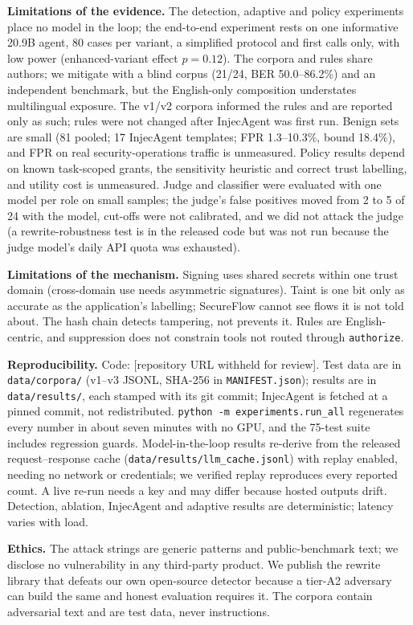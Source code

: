 \documentclass[conference]{IEEEtran}
\newcommand{\repourl}{[repository URL withheld for review]}
\newcommand{\repourl}{\url{https://github.com/piyushrajyadav/Secure-Flow}}
\begin{document}
\textbf{Limitations of the evidence.} The detection, adaptive and policy experiments place
no model in the loop; the end-to-end experiment rests on one informative 20.9B agent,
80 cases per variant, a simplified protocol and first calls only, with low power
(enhanced-variant effect $p=0.12$). The corpora and rules share authors; we mitigate with
a blind corpus (21/24, BER 50.0--86.2\%) and an independent benchmark, but the
English-only composition understates multilingual exposure. The v1/v2 corpora informed
the rules and are reported only as such; rules were not changed after InjecAgent was
first run. Benign sets are small (81 pooled; 17 InjecAgent templates; FPR 1.3--10.3\%,
bound 18.4\%), and FPR on real security-operations traffic is unmeasured. Policy results
depend on known task-scoped grants, the sensitivity heuristic and correct trust
labelling, and utility cost is unmeasured. Judge and classifier were evaluated with one
model per role on small samples; the judge's false positives moved from 2 to 5 of 24 with
the model, cut-offs were not calibrated, and we did not attack the judge (a
rewrite-robustness test is in the released code but was not run because the judge
model's daily API quota was exhausted).

\textbf{Limitations of the mechanism.} Signing uses shared secrets within one trust
domain (cross-domain use needs asymmetric signatures). Taint is one bit only as accurate
as the application's labelling; SecureFlow cannot see flows it is not told about. The
hash chain detects tampering, not prevents it. Rules are English-centric, and
suppression does not constrain tools not routed through \texttt{authorize}.

\textbf{Reproducibility.} Code: \repourl{}. Test data are in
\texttt{data/corpora/} (v1--v3 JSONL, SHA-256 in \texttt{MANIFEST.json}); results are in
\texttt{data/results/}, each stamped with its git commit; InjecAgent is fetched at a
pinned commit, not redistributed. \texttt{python -m experiments.run\_all} regenerates
every number in about seven minutes with no GPU, and the 75-test suite includes
regression guards. Model-in-the-loop results re-derive from the released
request--response cache (\texttt{data/results/llm\_cache.jsonl}) with replay enabled,
needing no network or credentials; we verified replay reproduces every reported count.
A live re-run needs a key and may differ because hosted outputs drift. Detection,
ablation, InjecAgent and adaptive results are deterministic; latency varies with load.

\textbf{Ethics.} The attack strings are generic patterns and public-benchmark text; we
disclose no vulnerability in any third-party product. We publish the rewrite library that
defeats our own open-source detector because a tier-A2 adversary can build the same and
honest evaluation requires it. The corpora contain adversarial text and are test data,
never instructions.
\end{document}
